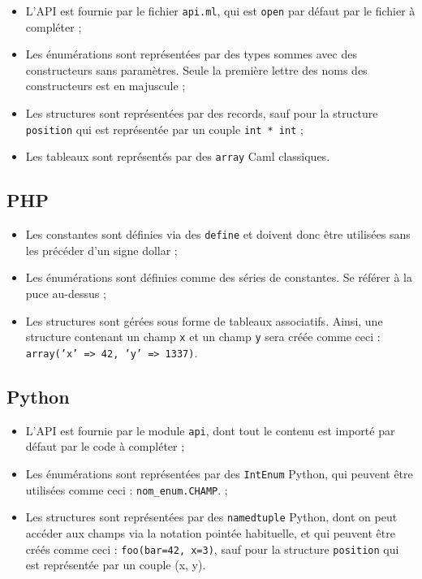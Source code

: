 \begin{itemize}
\item{L'API est fournie par le fichier \texttt{api.ml}, qui est \texttt{open}
      par défaut par le fichier à compléter ;}
\item{Les énumérations sont représentées par des types sommes avec des
      constructeurs sans paramètres. Seule la première lettre des noms des
      constructeurs est en majuscule ;}

\item{Les structures sont représentées par des records, sauf pour la structure
      \texttt{position} qui est représentée par un couple \texttt{int * int} ;}
\item{Les tableaux sont représentés par des \texttt{array} Caml classiques.}
\end{itemize}

\subsection{PHP}

\begin{itemize}
\item{Les constantes sont définies via des \texttt{define} et doivent donc être
      utilisées sans les précéder d'un signe dollar ;}
\item{Les énumérations sont définies comme des séries de constantes. Se référer
      à la puce au-dessus ;}
\item{Les structures sont gérées sous forme de tableaux associatifs. Ainsi, une
      structure contenant un champ \texttt{x} et un champ \texttt{y} sera créée
      comme ceci : \texttt{array('x' => 42, 'y' => 1337)}.}
\end{itemize}

\subsection{Python}

\begin{itemize}
\item{L'API est fournie par le module \texttt{api}, dont tout le contenu est
      importé par défaut par le code à compléter ;}
\item{Les énumérations sont représentées par des \texttt{IntEnum} Python, qui
      peuvent être utilisées comme ceci : \texttt{nom\_enum.CHAMP}. ;}
\item{Les structures sont représentées par des \texttt{namedtuple} Python, dont
      on peut accéder aux champs via la notation pointée habituelle, et
      qui peuvent être créés comme ceci : \texttt{foo(bar=42, x=3)}, sauf pour
      la structure \texttt{position} qui est représentée par un couple (x, y).}
\end{itemize}

